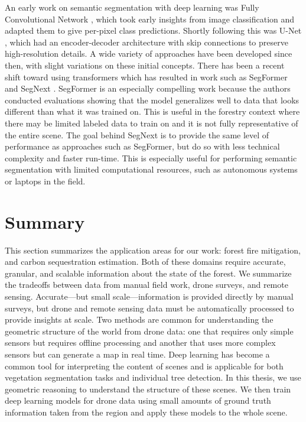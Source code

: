 An early work on semantic segmentation with deep learning was Fully Convolutional Network \cite{Shelhamer2017FullySegmentation}, which took early insights from image classification and adapted them to give per-pixel class predictions. Shortly following this was U-Net \cite{RonnebergerUNET2015}, which had an encoder-decoder architecture with skip connections to preserve high-resolution details. A wide variety of approaches have been developed since then, with slight variations on these initial concepts. There has been a recent shift toward using transformers \cite{Vaswani2017AttentionNeed} which has resulted in work such as SegFormer \cite{Xie2021} and SegNext \cite{Guo2022SegNeXt:Segmentation}. SegFormer is an especially compelling work because the authors conducted evaluations showing that the model generalizes well to data that looks different than what it was trained on. This is useful in the forestry context where there may be limited labeled data to train on and it is not fully representative of the entire scene. The goal behind SegNext is to provide the same level of performance as approaches such as SegFormer, but do so with less technical complexity and faster run-time. This is especially useful for performing semantic segmentation with limited computational resources, such as autonomous systems or laptops in the field.

\section{Summary}
This section summarizes the application areas for our work: forest fire mitigation, and carbon sequestration estimation. Both of these domains require accurate, granular, and scalable information about the state of the forest. We summarize the tradeoffs between data from manual field work, drone surveys, and remote sensing. Accurate---but small scale---information is provided directly by manual surveys, but drone and remote sensing data must be automatically processed to provide insights at scale. Two methods are common for understanding the geometric structure of the world from drone data: one that requires only simple sensors but requires offline processing and another that uses more complex sensors but can generate a map in real time. Deep learning has become a common tool for interpreting the content of scenes and is applicable for both vegetation segmentation tasks and individual tree detection. In this thesis, we use geometric reasoning to understand the structure of these scenes. We then train deep learning models for drone data using small amounts of ground truth information taken from the region and apply these models to the whole scene.